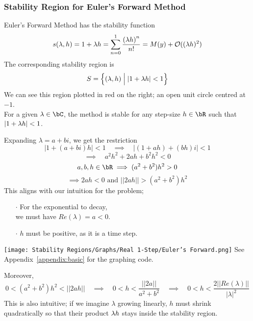 \subsubsection{Stability Region for Euler's Forward Method}
\begin{multicols}{2}
Euler's Forward Method has the stability function
\[s(\lambda, h) = 1 + \lambda h = \sum\limits_{n=0}^{1} \frac{{(\lambda h)}^n}{n!} = M(y) + \mathcal{O}((\lambda h)^2)\]
The corresponding stability region is 
\[S = \Big\{ (\lambda, h) \;\Big|\; |1 + \lambda h| < 1\Big\}\]
We can see this region plotted in red on the right; an open unit circle centred at $-1$.\\

For a given $\lambda \in \bC$, the method is stable for any step-size $h \in \bR$ such that $|1 + \lambda h| < 1$.\\

\par Expanding $\lambda = a + bi$, we get the restriction
\[|1 + (a + bi)h| < 1 \quad \implies \quad |(1+ah) + (bh)i| < 1\] 
\[\implies \quad a^2h^2 + 2ah + b^2h^2 < 0\]
\[a, b, h \in \bR \implies (a^2 +b^2)h^2 > 0\] 
\[\implies 2ah < 0 \text{ and } ||2ah|| > (a^2 + b^2)h^2\]
This aligns with our intuition for the problem;
\begin{itemize}
	\item[$\cdot$] For the exponential to decay,\\
	      we must have $Re(\lambda) = a < 0$.
	\item[$\cdot$] $h$ must be positive, as it is a time step.
\end{itemize}
\columnbreak{}
\vspace*{\fill}
\begin{center}
\texttt{[image: Stability Regions/Graphs/Real 1-Step/Euler's Forward.png]}
See Appendix~\ref{appendix:basic} for the graphing code.\\
\end{center}
\vspace*{\fill}
\end{multicols}
Moreover, 
\[0 < (a^2 +b^2)h^2< ||2ah|| \quad\implies\quad 0 < h < \frac{||2a||}{a^2 + b^2} \quad\implies\quad 0 < h < \frac{2 ||Re(\lambda)||}{{|\lambda|}^2}\]
This is also intuitive; if we imagine $\lambda$ growing linearly, $h$ must shrink quadratically so that their product $\lambda h$ stays inside the stability region.\\

